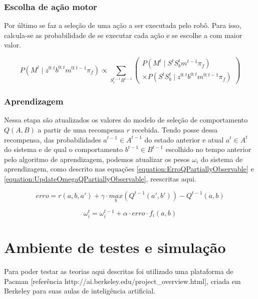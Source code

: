 \subsubsection{Escolha de ação motor}

Por último se faz a seleção de uma ação a ser executada pelo robô. Para isso, calcula-se as probabilidade de se executar cada ação e se escolhe a com maior valor.
		
\begin{equation}
    P \left( M^t \mid z^{0: t} b^{0: t} m^{0: t-1} \pi_f \right) \propto \sum\limits_{S_i^{t-1} B^{t-1}}
        \left(
            \begin{array}{l}
                P \left( M^t \mid S^t S_b^t m^{t-1} \pi_f \right)\\
                \times P \left( S^t S_b^t \mid z^{0: t} b^{0: t} m^{0: t-1} \pi_f \right)
            \end{array}
        \right)
\end{equation}


\subsubsection{Aprendizagem}

Nessa etapa são atualizados os valores do modelo de seleção de comportamento $ Q \left( A, B \right) $ a partir de uma recompensa $ r $ recebida. Tendo posse dessa recompensa, das probabilidades $ a^{t-1} \in A^{t-1} $ do estado anterior e atual $ a^t \in A^t $ do sistema e de qual o comportamento $ b^{t-1} \in B^{t-1} $ escolhido no tempo anterior pelo algoritmo de aprendizagem, podemos atualizar os pesos $ \omega_i $ do sistema de aprendizagem, como descrito nas equações \ref{equation:ErroQPartiallyObservable} e \ref{equation:UpdateOmegaQPartiallyObservable}, reescritas aqui.

$$
	erro = r \left( a, b, a' \right) + \gamma \cdot \underset{b}{max} \left( Q^{t-1} \left( a', b' \right) \right) - Q^{t-1} \left( a, b \right)
$$

$$
	\omega_i^t = \omega_i^{t-1} + \alpha \cdot erro \cdot f_i \left( a, b \right)
$$



\section{Ambiente de testes e simulação}

Para poder testar as teorias aqui descritas foi utilizado uma plataforma de Pacman [referência http://ai.berkeley.edu/project\_overview.html], criada em Berkeley para suas aulas de inteligência artificial.

